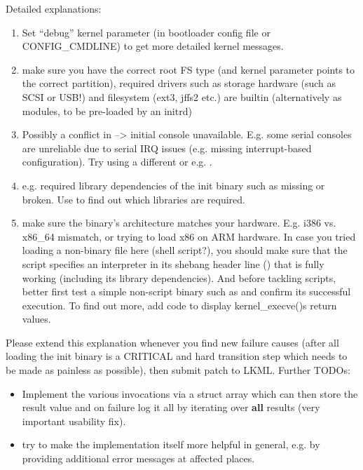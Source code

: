 \documentclass[a4paper,8pt,english]{sphinxmanual}
\begin{document}
Detailed explanations:
\begin{enumerate}
\item {} 
Set ``debug'' kernel parameter (in bootloader config file or CONFIG\_CMDLINE)
to get more detailed kernel messages.

\item {} 
make sure you have the correct root FS type
(and  kernel parameter points to the correct partition),
required drivers such as storage hardware (such as SCSI or USB!)
and filesystem (ext3, jffs2 etc.) are builtin (alternatively as modules,
to be pre-loaded by an initrd)

\item {} 
Possibly a conflict in  --\textgreater{} initial console unavailable.
E.g. some serial consoles are unreliable due to serial IRQ issues (e.g.
missing interrupt-based configuration).
Try using a different  or e.g. .

\item {} 
e.g. required library dependencies of the init binary such as
 missing or broken. Use
 to find out which libraries are required.

\item {} 
make sure the binary's architecture matches your hardware.
E.g. i386 vs. x86\_64 mismatch, or trying to load x86 on ARM hardware.
In case you tried loading a non-binary file here (shell script?),
you should make sure that the script specifies an interpreter in its shebang
header line () that is fully working (including its library
dependencies). And before tackling scripts, better first test a simple
non-script binary such as  and confirm its successful execution.
To find out more, add code  to display kernel\_execve()s
return values.

\end{enumerate}

Please extend this explanation whenever you find new failure causes
(after all loading the init binary is a CRITICAL and hard transition step
which needs to be made as painless as possible), then submit patch to LKML.
Further TODOs:
\begin{itemize}
\item {} 
Implement the various  invocations via a struct array
which can then store the  result value and on failure
log it all by iterating over \textbf{all} results (very important usability fix).

\item {} 
try to make the implementation itself more helpful in general,
e.g. by providing additional error messages at affected places.

\end{itemize}
\end{document}
